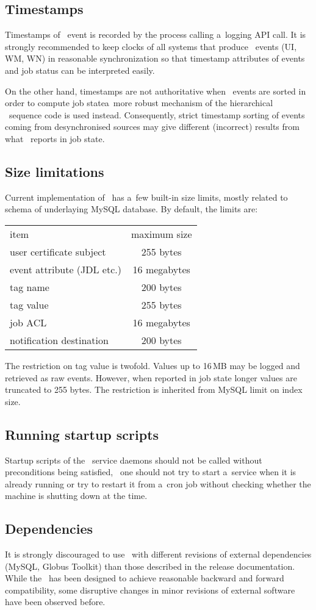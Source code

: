 \subsection{Timestamps}
Timestamps of \LB\ event is recorded by the process calling a~logging API call. It is strongly recommended
to keep clocks of all systems that produce \LB\ events (UI, WM, WN) in reasonable synchronization so that
timestamp attributes of events and job status can be interpreted easily.

On the other hand, timestamps are not authoritative when \LB\ events
are sorted in order to compute job state\Dash a~more robust mechanism
of the hierarchical \LB\ sequence code is used instead. 
Consequently, strict timestamp sorting of events coming from desynchronised
sources may give different (incorrect) results from what \LB\ reports in job
state.

\subsection{Size limitations}

Current implementation of \LB\ has a~few built-in size limits, mostly related
to schema of underlaying MySQL database. By default, the limits are:

\begin{tabular}{lc}
item & maximum size\\
user certificate subject&255 bytes\\
event attribute (JDL etc.) &16 megabytes\\
tag name&200 bytes\\
tag value&255 bytes\\
job ACL&16 megabytes\\
notification destination&200 bytes\\
\end{tabular}

The restriction on tag value is twofold.
Values up to 16\,MB may be logged and retrieved as raw events.
However, when reported in job state longer values are truncated to 255 bytes.
The restriction is inherited from MySQL limit on index size.

\subsection{Running startup scripts}

Startup scripts of the \LB\ service daemons should not be called without preconditions 
being satisfied, \eg\ one should not try to start a~service when it is already running
or try to restart it from a~cron job without checking whether the machine is shutting down
at the time.

\subsection{Dependencies}

It is strongly discouraged to use \LB\ with different revisions
of external dependencies (MySQL, Globus Toolkit)
than those described in the release documentation. While the \LB\ has been designed to achieve
reasonable backward and forward compatibility, some disruptive changes in minor revisions
of external software have been observed before.

